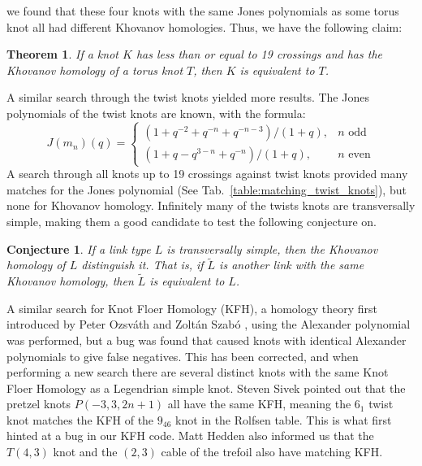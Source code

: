 \documentclass{article}
\theoremstyle{plain}
\newtheorem{theorem}{Theorem}
\newtheorem{conjecture}{Conjecture}
\begin{document}
        we found that these four knots with the same Jones polynomials as some
        torus knot all had different Khovanov homologies. Thus, we have the
        following claim:
        \begin{theorem}
            If a knot $K$ has less than or equal to 19 crossings and has the
            Khovanov homology of a torus knot $T$,
            then $K$ is equivalent to $T$.
        \end{theorem}
        A similar search through the twist knots yielded more results.
        The Jones polynomials of the twist knots are known, with the formula:
        \begin{equation}
            J(m_{n})(q)=
            \begin{cases}
                (1+q^{-2}+q^{-n}+q^{-n-3})/(1+q),&n\textrm{ odd}\\
                (1+q-q^{3-n}+q^{-n})/(1+q),&n\textrm{ even}
            \end{cases}
        \end{equation}
        A search through all knots up to 19 crossings against twist knots
        provided many matches for the Jones polynomial
        (See Tab.~\ref{table:matching_twist_knots}), but
        none for Khovanov homology. Infinitely many of the twists knots are
        transversally simple, making them a good candidate to test the following
        conjecture on.
        \begin{conjecture}
            If a link type $L$ is transversally simple, then the Khovanov
            homology of $L$ distinguish it. That is, if $\tilde{L}$
            is another link with the same Khovanov homology, then $\tilde{L}$ is
            equivalent to $L$.
        \end{conjecture}
        A similar search for Knot Floer Homology (KFH), a homology theory
        first introduced by Peter Ozsv\'{a}th and Zolt\'{a}n Szab\'{o}
        \cite{ozsvathszabo2004}, using the Alexander polynomial
        was performed, but a bug was found that caused knots with identical
        Alexander polynomials to give false negatives. This has been corrected,
        and when performing a new search there are several distinct knots
        with the same Knot Floer Homology as a Legendrian simple knot. Steven
        Sivek pointed
        out that the pretzel knots $P(-3,3,2n+1)$ all have the same KFH, meaning
        the $6_{1}$ twist knot matches the KFH of the $9_{46}$ knot in the
        Rolfsen table. This is what first hinted at a bug in our KFH code.
        Matt Hedden also informed us that the $T(4,3)$ knot and the
        $(2,3)$ cable of the trefoil also have matching KFH.
\end{document}
